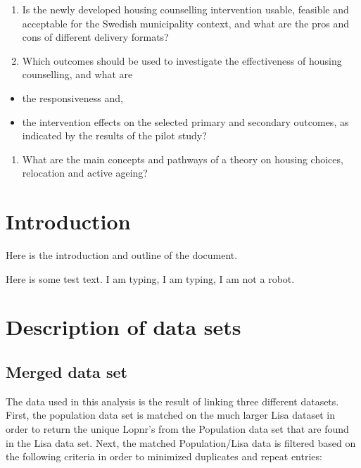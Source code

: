 \documentclass[
]{book}
\providecommand{\tightlist}{%
  \setlength{\itemsep}{0pt}\setlength{\parskip}{0pt}}
\begin{document}
\begin{enumerate}
\def\labelenumi{\arabic{enumi}.}
\setcounter{enumi}{7}
\tightlist
\item
  Is the newly developed housing counselling intervention usable, feasible and acceptable for the Swedish municipality context, and what are the pros and cons of different delivery formats?
\item
  Which outcomes should be used to investigate the effectiveness of housing counselling, and what are
\end{enumerate}

\begin{itemize}
\tightlist
\item
  the responsiveness and,
\item
  the intervention effects on the selected primary and secondary outcomes, as indicated by the results of the pilot study?
\end{itemize}

\begin{enumerate}
\def\labelenumi{\arabic{enumi}.}
\setcounter{enumi}{9}
\tightlist
\item
  What are the main concepts and pathways of a theory on housing choices, relocation and active ageing?
\end{enumerate}

\hypertarget{intro}{%
\chapter{Introduction}\label{intro}}

Here is the introduction and outline of the document.

Here is some test text. I am typing, I am typing, I am not a robot.

\hypertarget{description-of-data-sets}{%
\chapter{Description of data sets}\label{description-of-data-sets}}

\hypertarget{merged-data-set}{%
\section{Merged data set}\label{merged-data-set}}

The data used in this analysis is the result of linking three different datasets. First, the population data set is matched on the much larger Lisa dataset in order to return the unique Lopnr's from the Population data set that are found in the Lisa data set. Next, the matched Population/Lisa data is filtered based on the following criteria in order to minimized duplicates and repeat entries:
\end{document}
